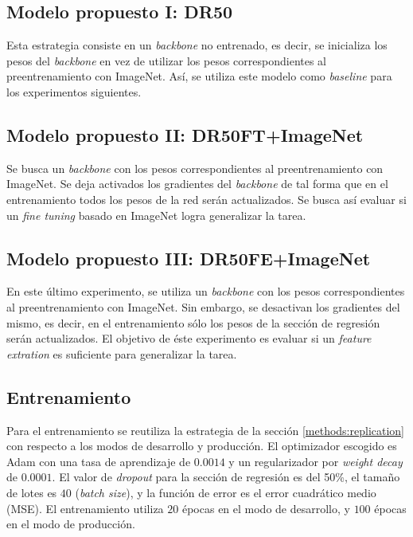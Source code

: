 \documentclass[../tesis.tex]{subfiles}
\begin{document}
\subsection{Modelo propuesto I: DR50}
Esta estrategia consiste en un \textit{backbone} no entrenado, es decir, se inicializa los pesos del \textit{backbone} en vez de utilizar los pesos correspondientes al preentrenamiento con ImageNet. Así, se utiliza este modelo como \textit{baseline} para los experimentos siguientes.

\subsection{Modelo propuesto II: DR50FT+ImageNet}
Se busca un \textit{backbone} con los pesos correspondientes al preentrenamiento con ImageNet. Se deja activados los gradientes del \textit{backbone} de tal forma que en el entrenamiento todos los pesos de la red serán actualizados. Se busca así evaluar si un \textit{fine tuning} basado en ImageNet logra generalizar la tarea.

\subsection{Modelo propuesto III: DR50FE+ImageNet}
En este último experimento, se utiliza un \textit{backbone} con los pesos correspondientes al preentrenamiento con ImageNet. Sin embargo, se desactivan los gradientes del mismo, es decir, en el entrenamiento sólo los pesos de la sección de regresión serán actualizados. El objetivo de éste experimento es evaluar si un \textit{feature extration} es suficiente para generalizar la tarea.

\subsection{Entrenamiento}
Para el entrenamiento se reutiliza la estrategia de la sección \ref{methods:replication} con respecto a los modos de desarrollo y producción. El optimizador escogido es Adam \cite{adam} con una tasa de aprendizaje de $0.0014$ y un regularizador por \textit{weight decay} de $0.0001$. El valor de \textit{dropout} para la sección de regresión es del 50\%, el tamaño de lotes es $40$ (\textit{batch size}), y la función de error es el error cuadrático medio (MSE). El entrenamiento utiliza $20$ épocas en el modo de desarrollo, y $100$ épocas en el modo de producción.\par\null\par
\end{document}
